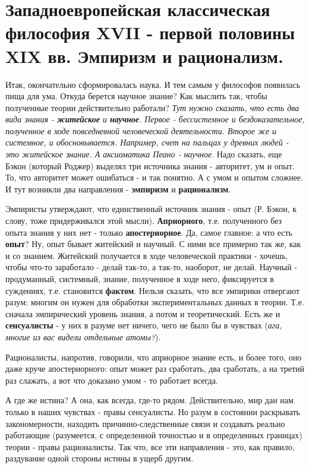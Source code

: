 \section{Западноевропейская классическая философия XVII - первой половины XIX вв. Эмпиризм и рационализм.}
Итак, окончательно сформировалась наука. И тем самым у философов появилась пища для ума. Откуда берется научное знание? Как мыслить так, чтобы полученные теории действительно работали? \textit{Тут нужно сказать, что есть два вида знания - \textbf{житейское} и \textbf{научное}. Первое - бессистемное и бездоказательное, полученное в ходе повседневной человеческой деятельности. Второе же и системное, и обосновывается. Например, счет на пальцах у древних людей - это житейское знание. А аксиоматика Пеано - научное}. Надо сказать, еще Бэкон (который Роджер) выделял три источника знания - авторитет, ум и опыт. То, что авторитет может ошибаться - и так понятно. А с умом и опытом сложнее. И тут возникли два направления - \textbf{эмпиризм} и \textbf{рационализм}.

Эмпиристы утверждают, что единственный источник знания - опыт (Р. Бэкон, к слову, тоже придерживался этой мысли). \textbf{Априорного}, т.е. полученного без опыта знания у них нет - только  \textbf{апостериорное}. Да, самое главное: а что есть \textbf{опыт}? Ну, опыт бывает житейский и научный. С ними все примерно так же, как и со знанием. Житейский получается в ходе человеческой практики - хочешь, чтобы что-то заработало - делай так-то, а так-то, наоборот, не делай. Научный - продуманный, системный, знание, полученное в ходе него, фиксируется в суждениях, т.е. становится \textbf{фактом}. Нельзя сказать, что все эмпирики отвергают разум: многим он нужен для обработки экспериментальных данных в теории. Т.е. сначала эмпирический уровень знания, а потом и теоретический. Есть же и \textbf{сенсуалисты} - у них в разуме нет ничего, чего не было бы в чувствах (\textit{ага, многие из вас видели отдельные атомы?}).

Рационалисты, напротив, говорили, что априорное знание есть, и более того, оно даже круче апостериорного: опыт может раз сработать, два сработать, а на третий раз слажать, а вот что доказано умом - то работает всегда.

А где же истина? А она, как всегда, где-то рядом. Действительно, мир дан нам только в наших чувствах - правы сенсуалисты. Но разум в состоянии раскрывать закономерности, находить причинно-следственные связи и создавать реально работающие (разумеется, с определенной точностью и в определенных границах) теории - правы рационалисты. Так что, все эти направления - это, как правило, раздувание одной стороны истины в ущерб другим.

